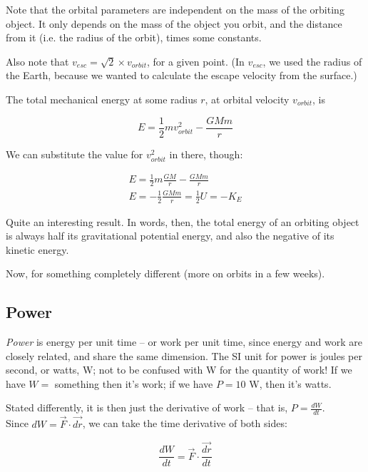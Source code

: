 Note that the orbital parameters are independent on the mass of the orbiting object. It only depends on the mass of the object you orbit, and the distance from it (i.e. the radius of the orbit), times some constants.

Also note that $v_{esc} = \sqrt{2} \times v_{orbit}$, for a given point. (In $v_{esc}$, we used the radius of the Earth, because we wanted to calculate the escape velocity from the surface.)

The total mechanical energy at some radius $r$, at orbital velocity $v_{orbit}$, is

\begin{equation}
E = \frac{1}{2} m v_{orbit}^2 - \frac{G M m}{r}
\end{equation}

We can substitute the value for $v_{orbit}^2$ in there, though:

\begin{align}
E = \frac{1}{2} m \frac{G M}{r} - \frac{G M m}{r}\\
E = -\frac{1}{2} \frac{G M m}{r} = \frac{1}{2} U = - K_E
\end{align}

Quite an interesting result. In words, then, the total energy of an orbiting object is always half its gravitational potential energy, and also the negative of its kinetic energy.

Now, for something completely different (more on orbits in a few weeks).

\subsection{Power}

\emph{Power} is energy per unit time -- or work per unit time, since energy and work are closely related, and share the same dimension. The SI unit for power is joules per second, or watts, W; not to be confused with W for the quantity of work! If we have $W = $ something then it's work; if we have $P = 10$ W, then it's watts.

Stated differently, it is then just the derivative of work -- that is, $P = \displaystyle \frac{dW}{dt}$.\\
Since $dW = \vec{F} \cdot \vec{dr}$, we can take the time derivative of both sides:

\begin{equation}
\frac{dW}{dt} = \vec{F} \cdot \frac{\vec{dr}}{dt}
\end{equation}

